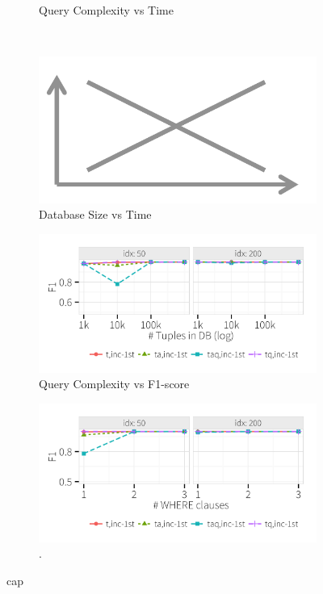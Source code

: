 \begin{figure}[h]
\begin{subfigure}[t]{.3\textwidth}
      \vspace*{-.1in}
      \caption{Query Complexity vs Time}
      \label{f:scale3} 
    \end{subfigure}
    \\
    \begin{subfigure}[t]{.3\textwidth}
      \includegraphics[width = .95\columnwidth]{figures/placeholder}
      \vspace*{-.1in}
      \caption{Database Size vs Time}
      \label{f:scale1} 
    \end{subfigure}
    \begin{subfigure}[t]{.3\textwidth}
      \includegraphics[width = .95\columnwidth]{figures/dbsize_acc}
      \vspace*{-.1in}
      \caption{Query Complexity vs F1-score}
      \label{f:scale2} 
    \end{subfigure}
    \begin{subfigure}[t]{.3\textwidth}
      \includegraphics[width = .95\columnwidth]{figures/where_acc}
      \vspace*{-.1in}
      \caption{.}
      \label{f:scale3} 
    \end{subfigure}
    \caption{cap}
  \end{figure}


